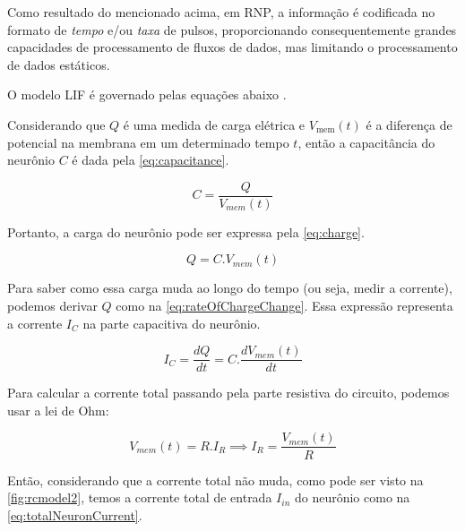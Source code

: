 			\par Como resultado do mencionado acima, em RNP, a informação é codificada no formato de \textit{tempo} e/ou \textit{taxa} de pulsos, proporcionando consequentemente grandes capacidades de processamento de fluxos de dados, mas limitando o processamento de dados estáticos.
			
			\par O modelo LIF é governado pelas equações abaixo \cite{10242251}.
			
			\par Considerando que $Q$ é uma medida de carga elétrica e $V_{\text{mem}}(t)$ é a diferença de potencial na membrana em um determinado tempo $t$, então a capacitância do neurônio $C$ é dada pela \autoref{eq:capacitance}.
			
			\begin{equation}
				\label{eq:capacitance}
				C = \frac{Q}{V_{mem}(t)}
			\end{equation}
			
			\par Portanto, a carga do neurônio pode ser expressa pela \autoref{eq:charge}.
			
			\begin{equation}
				\label{eq:charge}
				Q = C.V_{mem}(t)
			\end{equation}
			
			\par Para saber como essa carga muda ao longo do tempo (ou seja, medir a corrente), podemos derivar $Q$ como na \autoref{eq:rateOfChargeChange}. Essa expressão representa a corrente $I_C$ na parte capacitiva do neurônio.
			
			\begin{equation}
				\label{eq:rateOfChargeChange}
				I_C = \dfrac{dQ}{dt} = C. \dfrac{dV_{mem}(t)}{dt}
			\end{equation}
			
			\par Para calcular a corrente total passando pela parte resistiva do circuito, podemos usar a lei de Ohm:
			
			\begin{equation}
				\label{eq:ohmlaw}
				V_{mem}(t) = R.I_R \implies I_R = \frac{V_{mem}(t)}{R}
			\end{equation}
			
			\par Então, considerando que a corrente total não muda, como pode ser visto na  \autoref{fig:rcmodel2}, temos a corrente total de entrada $I_{in}$ do neurônio como na \autoref{eq:totalNeuronCurrent}.
			
